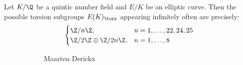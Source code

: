 \begin{frame}[plain]
\begin{thm}
Let $K/\Q$ be a quintic number field and $E/K$ be an elliptic curve. Then the possible torsion subgroups $E(K)_\tors$ appearing infinitely often are precisely:
	\[
	\begin{cases}
	\Z/n\Z, & n=1,\ldots,22,24,25 \\
	\Z/2\Z \oplus \Z/2n\Z, & n=1,\ldots,8
	\end{cases}
	\]
\end{thm}
	\begin{figure}[h]
	\centering
	\begin{subfigure}{0.3\textwidth}
	\captionsetup{labelformat=empty}
	\centering
	\caption{\hspace{0.1cm}Maarten Derickx}
	\end{subfigure}
	\begin{subfigure}{0.3\textwidth}
	\captionsetup{labelformat=empty}
	\centering

\end{subfigure}
\end{figure}
\end{frame}
